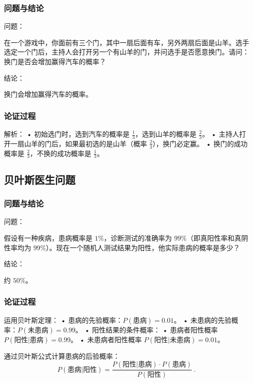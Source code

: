 \subsubsection{问题与结论}

问题：

在一个游戏中，你面前有三个门，其中一扇后面有车，另外两扇后面是山羊。选手选定一个门后，主持人会打开另一个有山羊的门，并问选手是否愿意换门。请问：换门是否会增加赢得汽车的概率？

结论：

换门会增加赢得汽车的概率。

\subsubsection{论证过程}


解析：
	•	初始选门时，选到汽车的概率是 $\frac{1}{3}$，选到山羊的概率是 $\frac{2}{3}$。
	•	主持人打开一扇山羊的门后，如果最初选的是山羊（概率 $\frac{2}{3}$），换门必定赢。
	•	换门的成功概率是 $\frac{2}{3}$，不换的成功概率是 $\frac{1}{3}$。

\subsection{贝叶斯医生问题}

\subsubsection{问题与结论}

问题：

假设有一种疾病，患病概率是 $1\%$，诊断测试的准确率为 $99\%$（即真阳性率和真阴性率均为 $99\%$）。现在一个随机人测试结果为阳性，他实际患病的概率是多少？

结论：

约 $50\%$。

\subsubsection{论证过程}
    
运用贝叶斯定理：
	•	患病的先验概率：$P(\text{患病}) = 0.01$。
	•	未患病的先验概率：$P(\text{未患病}) = 0.99$。
	•	阳性结果的条件概率：
	•	患病者阳性概率 $P(\text{阳性}|\text{患病}) = 0.99$。
	•	未患病者阳性概率 $P(\text{阳性}|\text{未患病}) = 0.01$。

通过贝叶斯公式计算患病的后验概率：
$$
P(\text{患病}|\text{阳性}) = \frac{P(\text{阳性}|\text{患病}) \cdot P(\text{患病})}{P(\text{阳性})}~.
$$

